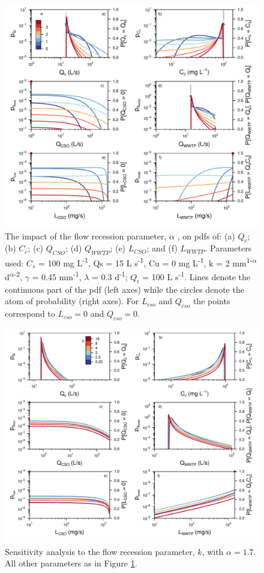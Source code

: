 \documentclass{agujournal2018}
\begin{document}
\begin{figure}[ht]
 \centering
\includegraphics[width=30pc]{Fig6.pdf}
 \caption{The impact of the f\/low recession parameter, $\alpha$ , on pdfs of: (a) $Q_c$; (b) $C_c$; (c) $Q_{CSO}$; (d) $Q_{WWTP}$; (e) $L_{CSO}$; and (f) $L_{WWTP}$. Parameters used: $C_s$ = 100 mg L\textsuperscript{-1}, Qs = 15 L s\textsuperscript{-1}, Cu = 0 mg L\textsuperscript{-1}, k = 2 mm\textsuperscript{1-$\alpha$} d\textsuperscript{$\alpha$-2}, $\gamma$ = 0.45 mm\textsuperscript{-1}, $\lambda$ = 0.3 d\textsuperscript{-1}; $Q_t$ = 100 L s\textsuperscript{-1}. Lines denote the continuous part of the pdf (left axes) while the circles denote the atom of probability (right axes). For $L_{cso}$ and $Q_{cso}$ the points correspond to $L_{cso} = 0$ and $Q_{cso} = 0$.}
 \label{figsix}
 \end{figure}
 
 
\begin{figure}[ht]
 \centering
 \includegraphics[width=30pc]{Fig7.pdf}
\caption{Sensitivity analysis to the f\/low recession parameter, $k$, with $\alpha = 1.7$. All other parameters as in Figure \ref{figsix}.}
 \label{figseven}
 \end{figure}
 
\end{document}
